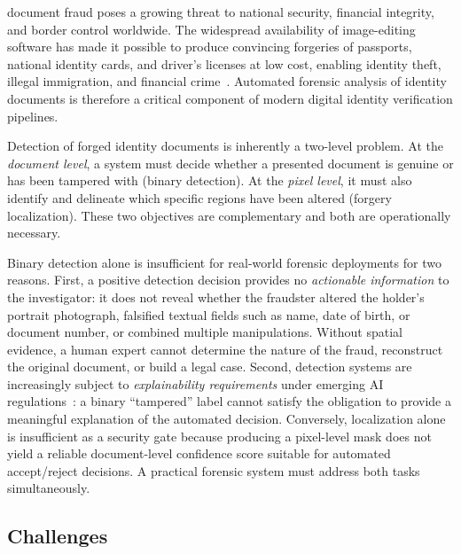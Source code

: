 
 document fraud poses a growing threat to national security,
financial integrity, and border control worldwide. The widespread availability of
image-editing software has made it possible to produce convincing forgeries of
passports, national identity cards, and driver's licenses at low cost, enabling
identity theft, illegal immigration, and financial crime~\cite{TODO_idfraud_report}.
Automated forensic analysis of identity documents is therefore a critical component
of modern digital identity verification pipelines.

Detection of forged identity documents is inherently a two-level problem. At the
\emph{document level}, a system must decide whether a presented document is genuine
or has been tampered with (binary detection). At the \emph{pixel level}, it must
also identify and delineate which specific regions have been altered (forgery
localization). These two objectives are complementary and both are operationally
necessary.

Binary detection alone is insufficient for real-world forensic deployments for two
reasons. First, a positive detection decision provides no \emph{actionable
information} to the investigator: it does not reveal whether the fraudster altered
the holder's portrait photograph, falsified textual fields such as name, date of
birth, or document number, or combined multiple manipulations. Without spatial
evidence, a human expert cannot determine the nature of the fraud, reconstruct
the original document, or build a legal case. Second, detection systems are
increasingly subject to \emph{explainability requirements} under emerging AI
regulations~\cite{TODO_euaiact}: a binary ``tampered'' label cannot satisfy the
obligation to provide a meaningful explanation of the automated decision.
Conversely, localization alone is insufficient as a security gate because
producing a pixel-level mask does not yield a reliable document-level confidence
score suitable for automated accept/reject decisions. A practical forensic
system must address both tasks simultaneously.

\subsection*{Challenges}

